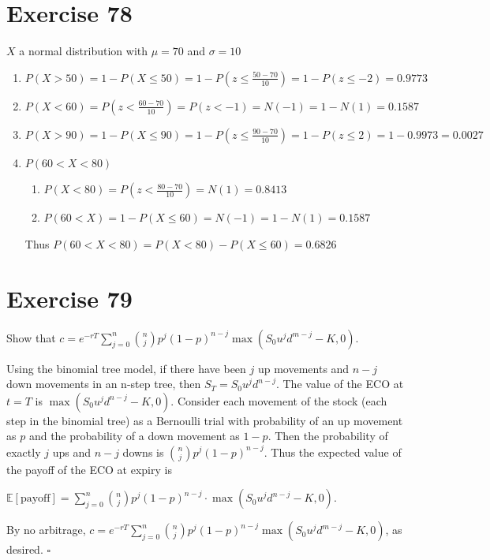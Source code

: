 \documentclass{article}
\begin{document}
\section*{Exercise 78}
\begin{flushleft}
    $X$ a normal distribution with $\mu = 70$ and $\sigma = 10$
    \begin{enumerate}
        \item $P(X>50) = 1-P(X\leq 50) = 1-P(z \leq \frac{50-70}{10}) = 1-P(z\leq -2) = 0.9773$
        \item $P(X<60) = P(z<\frac{60-70}{10}) = P(z<-1) = N(-1) = 1 - N(1) = 0.1587$
        \item $P(X>90) = 1 - P(X\leq 90) = 1-P(z\leq \frac{90-70}{10}) = 1-P(z\leq 2) = 1-0.9973 = 0.0027$
        \item $P(60<X<80)$
            \begin{enumerate}
                \item $P(X<80) = P(z < \frac{80-70}{10}) = N(1) = 0.8413$
                \item $P(60<X) = 1-P(X\leq 60) = N(-1) = 1-N(1)= 0.1587$
            \end{enumerate}
            Thus $P(60<X<80) = P(X<80) - P(X\leq60) = 0.6826$
    \end{enumerate}
\end{flushleft}

\section*{Exercise 79}
Show that $c = e^{-rT}\sum_{j=0}^{n} \binom{n}{j}p^j (1-p)^{n-j} \max(S_0u^jd^{m-j} - K, 0)$.
\begin{flushleft}
    Using the binomial tree model, if there have been $j$ up movements and $n-j$ down movements in an n-step tree,
    then $S_T = S_0u^jd^{n-j}$. The value of the ECO at $t = T$ is $\max(S_0u^jd^{n-j}-K, 0)$.
    Consider each movement of the stock (each step in the binomial tree) as a Bernoulli trial with probability of an up movement as $p$
    and the probability of a down movement as $1-p$. Then the probability of exactly $j$ ups and $n-j$ downs is 
    $\binom{n}{j}p^j(1-p)^{n-j}$. Thus the expected value of the payoff of the ECO at expiry is
    \begin{center}
        $\mathbb{E}[\text{payoff}] = \sum_{j=0}^{n}\binom{n}{j}p^j(1-p)^{n-j} \cdot \max(S_0u^jd^{n-j} - K, 0)$.
    \end{center}
    By no arbitrage, $c = e^{-rT}\sum_{j=0}^{n} \binom{n}{j}p^j (1-p)^{n-j} \max(S_0u^jd^{m-j} - K, 0)$, as desired. $\square$
\end{flushleft}
\end{document}
